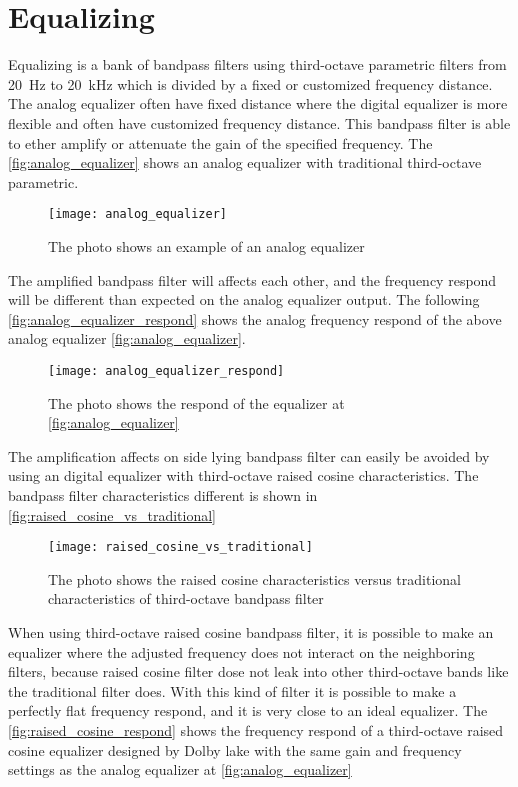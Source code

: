 \section{Equalizing}
Equalizing is a bank of bandpass filters using third-octave parametric filters from \SI{20}{\hertz} to \SI{20}{\kilo\hertz} which is divided by a fixed or customized frequency distance. The analog equalizer often have fixed distance where the digital equalizer is more flexible and often have customized frequency distance. This bandpass filter is able to ether amplify or attenuate the gain of the specified frequency. The \autoref{fig:analog_equalizer} shows an analog equalizer with traditional third-octave parametric. %

\begin{figure} [htbp]
 \centering
  \texttt{[image: analog\_equalizer]}
  \caption{The photo shows an example of an analog equalizer}
  \label{fig:analog_equalizer}
\end{figure}


The amplified bandpass filter will affects each other, and the frequency respond will be different than expected on the analog equalizer output. The following \autoref{fig:analog_equalizer_respond} shows the analog frequency respond of the above analog equalizer \autoref{fig:analog_equalizer}.

\begin{figure} [htbp]
 \centering
  \texttt{[image: analog\_equalizer\_respond]}
  \caption{The photo shows the respond of the equalizer at \autoref{fig:analog_equalizer} }
  \label{fig:analog_equalizer_respond}
\end{figure}

The amplification affects on side lying bandpass filter can easily be avoided by using an digital equalizer with third-octave raised cosine characteristics. The bandpass filter characteristics different is shown in \autoref{fig:raised_cosine_vs_traditional}


\begin{figure} [htbp]
 \centering
  \texttt{[image: raised\_cosine\_vs\_traditional]}
  \caption{The photo shows the raised cosine characteristics versus traditional characteristics of third-octave bandpass filter %
  }
  \label{fig:raised_cosine_vs_traditional}
\end{figure}



When using third-octave raised cosine bandpass filter, it is possible to make an equalizer where the adjusted frequency does not interact on the neighboring filters, because raised cosine filter dose not leak into other third-octave bands like the traditional filter does. With this kind of filter it is possible to make a perfectly flat frequency respond, and it is very close to an ideal equalizer. The \autoref{fig:raised_cosine_respond} shows the frequency respond of a third-octave raised cosine equalizer designed by Dolby lake with the same gain and frequency settings as the analog equalizer at \autoref{fig:analog_equalizer}

